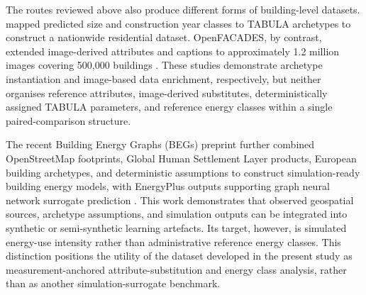 The routes reviewed above also produce different forms of building-level datasets.
\textcite{dabrock2025} mapped predicted size and construction year classes to TABULA archetypes to construct a nationwide residential dataset.
OpenFACADES, by contrast, extended image-derived attributes and captions to approximately 1.2 million images covering 500,000 buildings \parencite{liang2025}.
These studies demonstrate archetype instantiation and image-based data enrichment, respectively, but neither organises reference attributes, image-derived substitutes, deterministically assigned TABULA parameters, and reference energy classes within a single paired-comparison structure.

The recent Building Energy Graphs (BEGs) preprint further combined OpenStreetMap footprints, Global Human Settlement Layer products, European building archetypes, and deterministic assumptions to construct simulation-ready building energy models, with EnergyPlus outputs supporting graph neural network surrogate prediction \parencite{dalach2025}.
This work demonstrates that observed geospatial sources, archetype assumptions, and simulation outputs can be integrated into synthetic or semi-synthetic learning artefacts.
Its target, however, is simulated energy-use intensity rather than administrative reference energy classes.
This distinction positions the utility of the dataset developed in the present study as measurement-anchored attribute-substitution and energy class analysis, rather than as another simulation-surrogate benchmark.
